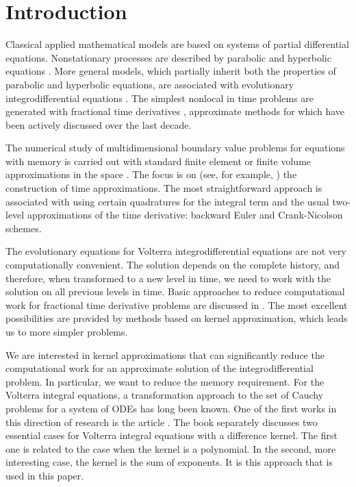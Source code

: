 \documentclass[3p]{elsarticle}
\numberwithin{equation}{section}
\begin{document}
\section{Introduction}\label{sec:1}

Classical applied mathematical models are based on systems of partial differential equations.
Nonstationary processes are described by parabolic and hyperbolic equations \cite{LionsBook,evans2010partial}.
More general models, which partially inherit both the properties of parabolic and hyperbolic equations,
are associated with evolutionary integrodifferential equations \cite{GripenbergBook1990,pruss2013evolutionary}.
The simplest nonlocal in time problems are generated with fractional time derivatives \cite{baleanu2012fractional,uchaikin}, approximate methods for which have been actively discussed over the last decade.

The numerical study of multidimensional boundary value problems for equations with memory is carried out with standard finite element or finite volume approximations in the space \cite{KnabnerAngermann2003,QuarteroniValli1994}.
The focus is on (see, for example, \cite{ChenBook1998}) the construction of time approximations.
The most straightforward approach \cite{mclean1993numerical,mclean1996discretization} is associated with using certain quadratures for the integral term and the usual two-level approximations of the time derivative:  backward Euler and Crank-Nicolson schemes.

The evolutionary equations for Volterra integrodifferential equations are not very computationally convenient.
The solution depends on the complete history, and therefore, when transformed to a new level in time, we need to work with the solution on all previous levels in time.
Basic approaches to reduce computational work for fractional time derivative problems are discussed in \cite{diethelm2020good}.
The most excellent possibilities are provided by methods based on kernel approximation, which leads us to more simpler problems.

We are interested in kernel approximations that can significantly reduce the computational work for an approximate solution of the integrodifferential problem. In particular, we want to reduce the memory requirement.
For the Volterra integral equations, a transformation approach to the set of Cauchy problems for a system of ODEs has long been known.
One of the first works in this direction of research is the article \cite{bownds1977note}.
The book \cite{linz1985analytical} separately discusses two essential cases for Volterra integral equations with a difference kernel.
The first one is related to the case when the kernel is a polynomial.
In the second, more interesting case, the kernel is the sum of exponents.
It is this approach that is used in this paper.
\end{document}
